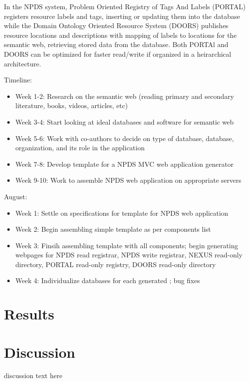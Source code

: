 \documentclass[10pt,twocolumn,twoside]{article}
\begin{document}
	In the NPDS system, Problem Oriented Registry of Tags And Labels (PORTAL) registers resource labels and tags, inserting or updating them into the database while the Domain Ontology Oriented Resource System (DOORS) publishes resource locations and descriptions with mapping of labels to locations for the semantic web, retrieving stored data from the database. Both PORTAl and DOORS can be optimized for faster read/write if organized in a heirarchical architecture.

Timeline:
\begin{itemize}
	\item Week 1-2: Research on the semantic web (reading primary and secondary literature, books, videos, articles, etc)
	\item Week 3-4: Start looking at ideal databases and software for semantic web
	\item Week 5-6: Work with co-authors to decide on type of database, database, organization, and its role in the application
	\item Week 7-8: Develop template for a NPDS MVC web application generator
	\item Week 9-10: Work to assemble NPDS web application on appropriate servers
\end{itemize}

August:
\begin{itemize}
	\item Week 1: Settle on specifications for template for NPDS web application
	\item Week 2: Begin assembling simple template as per components list
	\item Week 3: Finsih assembling template with all components; begin generating webpages for NPDS read registrar, NPDS write registrar, NEXUS read-only directory, PORTAL read-only registry, DOORS read-only directory
	\item Week 4: Individualize databases for each generated ; bug fixes
\end{itemize}
	

\section*{Results}



\section*{Discussion}
\label{secDiscussion}
discussion text here
\end{document}

